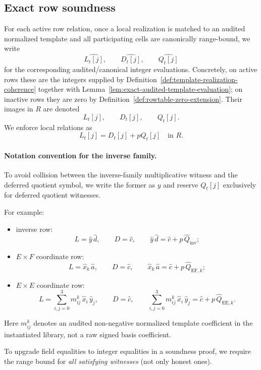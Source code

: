 ﻿\documentclass[11pt]{article}
\newcommand{\wt}[1]{\widehat{#1}}
\begin{document}
\subsection{Exact row soundness}

For each active row relation, once a local realization is matched to an audited
normalized template and all participating cells are canonically range-bound, we
write
\[
\wt{L_t[j]},\qquad \wt{D_t[j]},\qquad \wt{Q_t[j]}
\]
for the corresponding audited/canonical integer evaluations. Concretely, on
active rows these are the integers supplied by
Definition~\ref{def:template-realization-coherence} together with
Lemma~\ref{lem:exact-audited-template-evaluation}; on inactive rows they are
zero by Definition~\ref{def:rowtable-zero-extension}. Their images in \(R\) are
denoted
\[
L_t[j],\qquad D_t[j],\qquad Q_t[j].
\]
We enforce local relations as
\[
L_t[j]=D_t[j]+pQ_t[j]\quad\text{in }R.
\]

\paragraph{Notation convention for the inverse family.}
To avoid collision between the inverse-family multiplicative witness and the
deferred quotient symbol, we write the former as \(y\) and reserve \(Q_t[j]\)
exclusively for deferred quotient witnesses.

For example:
\begin{itemize}[leftmargin=2em]
    \item inverse row:
    \[
    L = \wt{y}\,\wt{d},
    \qquad
    D = \wt{c},
    \qquad
    \wt{y}\,\wt{d} = \wt{c} + p\,\wt{Q}_{\mathrm{inv}};
    \]
    \item \(E\times F\) coordinate row:
    \[
    L = \wt{x}_k\,\wt{a},
    \qquad
    D = \wt{c},
    \qquad
    \wt{x}_k\,\wt{a} = \wt{c} + p\,\wt{Q}_{\mathrm{EF},k};
    \]
    \item \(E\times E\) coordinate row:
    \[
    L = \sum_{i,j=0}^{3} m_{ij}^k\,\wt{x}_i\,\wt{y}_j,
    \qquad
    D = \wt{c},
    \qquad
    \sum_{i,j=0}^{3} m_{ij}^k\,\wt{x}_i\,\wt{y}_j
    =
    \wt{c} + p\,\wt{Q}_{\mathrm{EE},k}.
    \]
\end{itemize}
Here \(m_{ij}^k\) denotes an audited non-negative normalized template
coefficient in the instantiated library, not a raw signed basis coefficient.

To upgrade field equalities to integer equalities in a soundness proof, we require
the range bound for \emph{all satisfying witnesses} (not only honest ones).
\end{document}
